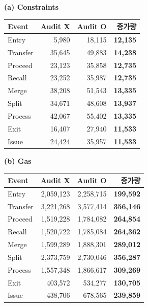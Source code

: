 \par\medskip\noindent
\begin{minipage}[t]{.49\linewidth}\centering
{\small\setlength{\tabcolsep}{7pt}\renewcommand{\arraystretch}{1.12}
\textbf{(a) Constraints}\par\smallskip
\begin{tabular}{@{}lrrr@{}}\toprule
\textbf{Event} & \textbf{Audit X} & \textbf{Audit O} & \textbf{증가량} \\
\midrule
Entry & 5,980 & 18,115 & \textbf{12,135} \\
Transfer & 35,645 & 49,883 & \textbf{14,238} \\
Proceed & 23,123 & 35,858 & \textbf{12,735} \\
Recall & 23,252 & 35,987 & \textbf{12,735} \\
Merge & 38,208 & 51,543 & \textbf{13,335} \\
Split & 34,671 & 48,608 & \textbf{13,937} \\
Process & 42,067 & 55,402 & \textbf{13,335} \\
Exit & 16,407 & 27,940 & \textbf{11,533} \\
Issue & 24,424 & 35,957 & \textbf{11,533} \\
\bottomrule\end{tabular}}
\end{minipage}\hfill
\begin{minipage}[t]{.49\linewidth}\centering
{\small\setlength{\tabcolsep}{7pt}\renewcommand{\arraystretch}{1.12}
\textbf{(b) Gas}\par\smallskip
\begin{tabular}{@{}lrrr@{}}\toprule
\textbf{Event} & \textbf{Audit X} & \textbf{Audit O} & \textbf{증가량} \\
\midrule
Entry & 2,059,123 & 2,258,715 & \textbf{199,592} \\
Transfer & 3,221,268 & 3,577,414 & \textbf{356,146} \\
Proceed & 1,519,228 & 1,784,082 & \textbf{264,854} \\
Recall & 1,520,722 & 1,785,084 & \textbf{264,362} \\
Merge & 1,599,289 & 1,888,301 & \textbf{289,012} \\
Split & 2,373,759 & 2,730,046 & \textbf{356,287} \\
Process & 1,557,348 & 1,866,617 & \textbf{309,269} \\
Exit & 403,572 & 534,277 & \textbf{130,705} \\
Issue & 438,706 & 678,565 & \textbf{239,859} \\
\bottomrule\end{tabular}}
\end{minipage}
\par\medskip
